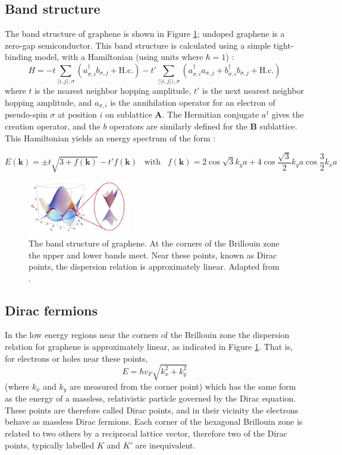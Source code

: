 \documentclass[edeposit,fullpage,draftthesis]{uiucthesis2009}
\begin{document}
	\subsection{Band structure}
    The band structure of graphene is shown in Figure \ref{fig:bandstructure}; undoped graphene is a zero-gap semiconductor. This band structure is calculated using a simple tight-binding model, with a Hamiltonian (using units where $\hbar=1$) \cite{CastroNeto2009}:
    $$
    H = - t \sum\limits_{\langle i,j\rangle,\sigma} (a_{\sigma,i}^\dagger b_{\sigma,j} + \text{H.c.})
    - t' \sum\limits_{\langle\langle i,j\rangle\rangle,\sigma} (a_{\sigma,i}^\dagger a_{\sigma,j} + b_{\sigma,i}^\dagger b_{\sigma,j} + \text{H.c.})
    $$
    where $t$ is the nearest neighbor hopping amplitude, $t'$ is the next nearest neighbor hopping amplitude, and $a_{\sigma,i}$ is the annihilation operator for an electron of pseudo-spin $\sigma$ at position $i$ on sublattice \textbf{A}. The Hermitian conjugate $a^\dagger$ gives the creation operator, and the $b$ operators are similarly defined for the \textbf{B} sublattice. This Hamiltonian yields an energy spectrum of the form \cite{CastroNeto2009}:

    $$
    E(\mathbf{k}) = \pm t \sqrt{3 + f(\mathbf{k})} - t' f(\mathbf{k}) \;\;\; \text{with} \;\;\;
    f(\mathbf{k}) = 2 \cos{\sqrt{3} k_y a } + 4 \cos{\frac{\sqrt{3}}{2} k_y a} \cos{\frac{3}{2} k_x a}
    $$

    \begin{figure}
    \centering
    \includegraphics[width=0.4\textwidth]{images/background/ElecPropertiesFig3.png}
    \caption[The band structure of graphene]{The band structure of graphene. At the corners of the Brillouin zone the upper and lower bands meet. Near these points, known as Dirac points, the dispersion relation is approximately linear. Adapted from \cite{CastroNeto2009}.}
    \label{fig:bandstructure}
    \end{figure}


	\subsection{Dirac fermions}
    In the low energy regions near the corners of the Brillouin zone the dispersion relation for graphene is approximately linear, as indicated in Figure \ref{fig:bandstructure}. That is, for electrons or holes near these points,
    $$
    E = \hbar v_F \sqrt{k_x^2 + k_y^2}
    $$
    (where $k_x$ and $k_y$ are measured from the corner point) which has the same form as the energy of a massless, relativistic particle governed by the Dirac equation. These points are therefore called Dirac points, and in their vicinity the electrons behave as massless Dirac fermions. Each corner of the hexagonal Brillouin zone is related to two others by a reciprocal lattice vector, therefore two of the Dirac points, typically labelled $K$ and $K'$ are inequivalent.
\end{document}
